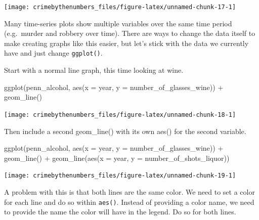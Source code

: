 \documentclass[
]{krantz}
\makeatletter
\newenvironment{Shaded}{\begin{snugshade}}{\end{snugshade}}
\newcommand{\AttributeTok}[1]{\textcolor[rgb]{0.61,0.61,0.61}{#1}}
\newcommand{\FunctionTok}[1]{\textcolor[rgb]{0,0,0}{#1}}
\newcommand{\NormalTok}[1]{#1}
\newcommand{\SpecialCharTok}[1]{\textcolor[rgb]{0,0,0}{#1}}
\newenvironment{kframe}{%
\medskip{}
\setlength{\fboxsep}{.8em}
 \def\at@end@of@kframe{}%
 \ifinner\ifhmode%
  \def\at@end@of@kframe{\end{minipage}}%
  \begin{minipage}{\columnwidth}%
 \fi\fi%
 \def\FrameCommand##1{\hskip\@totalleftmargin \hskip-\fboxsep
 \colorbox{shadecolor}{##1}\hskip-\fboxsep
     \hskip-\linewidth \hskip-\@totalleftmargin \hskip\columnwidth}%
 \MakeFramed {\advance\hsize-\width
   \@totalleftmargin\z@ \linewidth\hsize
   \@setminipage}}%
 {\par\unskip\endMakeFramed%
 \at@end@of@kframe}
\renewenvironment{Shaded}{\begin{kframe}}{\end{kframe}}
\makeatother
\begin{document}
\begin{center}\texttt{[image: crimebythenumbers\_files/figure-latex/unnamed-chunk-17-1]} \end{center}

Many time-series plots show multiple variables over the same time period (e.g.~murder and robbery over time). There are ways to change the data itself to make creating graphs like this easier, but let's stick with the data we currently have and just change \texttt{ggplot()}.

Start with a normal line graph, this time looking at wine.

\begin{Shaded}
\begin{Highlighting}[]
\FunctionTok{ggplot}\NormalTok{(penn\_alcohol, }\FunctionTok{aes}\NormalTok{(}\AttributeTok{x =}\NormalTok{ year, }\AttributeTok{y =}\NormalTok{ number\_of\_glasses\_wine)) }\SpecialCharTok{+}
  \FunctionTok{geom\_line}\NormalTok{()}
\end{Highlighting}
\end{Shaded}

\begin{center}\texttt{[image: crimebythenumbers\_files/figure-latex/unnamed-chunk-18-1]} \end{center}

Then include a second geom\_line() with its own aes() for the second variable.

\begin{Shaded}
\begin{Highlighting}[]
\FunctionTok{ggplot}\NormalTok{(penn\_alcohol, }\FunctionTok{aes}\NormalTok{(}\AttributeTok{x =}\NormalTok{ year, }\AttributeTok{y =}\NormalTok{ number\_of\_glasses\_wine)) }\SpecialCharTok{+}
  \FunctionTok{geom\_line}\NormalTok{() }\SpecialCharTok{+}
  \FunctionTok{geom\_line}\NormalTok{(}\FunctionTok{aes}\NormalTok{(}\AttributeTok{x =}\NormalTok{ year, }\AttributeTok{y =}\NormalTok{ number\_of\_shots\_liquor))}
\end{Highlighting}
\end{Shaded}

\begin{center}\texttt{[image: crimebythenumbers\_files/figure-latex/unnamed-chunk-19-1]} \end{center}

A problem with this is that both lines are the same color. We need to set a color for each line and do so within \texttt{aes()}. Instead of providing a color name, we need to provide the name the color will have in the legend. Do so for both lines.
\end{document}
